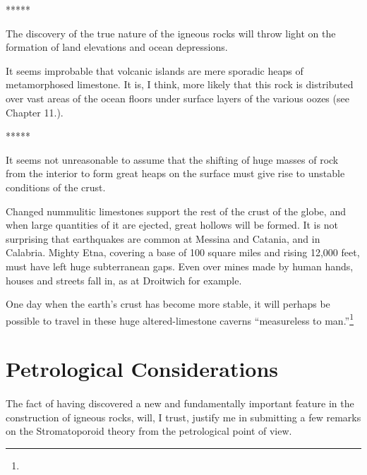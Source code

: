 \documentclass[a4paper, 12pt, oneside]{article}
\begin{document}
\centerline{*\hspace{15mm}*\hspace{15mm}*\hspace{15mm}*\hspace{15mm}*}
\bigskip

The discovery of the true nature of the igneous rocks will throw light on the formation of land elevations and ocean depressions.

It seems improbable that volcanic islands are mere sporadic heaps of metamorphosed limestone. It is, I think, more likely that this rock is distributed over vast areas of the ocean floors under surface layers of the various oozes (see Chapter 11.).

\centerline{*\hspace{15mm}*\hspace{15mm}*\hspace{15mm}*\hspace{15mm}*}
\bigskip

It seems not unreasonable to assume that the shifting of huge masses of rock from the interior to form great heaps on the surface must give rise to unstable conditions of the crust.

Changed nummulitic limestones support the rest of the crust of the globe, and when large quantities of it are ejected, great hollows will be formed. It is not surprising that earthquakes are common at Messina and Catania, and in Calabria. Mighty Etna, covering a base of 100 square miles and rising 12,000 feet, must have left huge subterranean gaps. Even over mines made by human hands, houses and streets fall in, as at Droitwich for example.

One day when the earth's crust has become more stable, it will perhaps be possible to travel in these huge altered-limestone caverns ``measureless to man.''\footnote{}
\clearpage
\section{Petrological Considerations}
\paragraph{}
The fact of having discovered a new and fundamentally important feature in the construction of igneous rocks, will, I trust, justify me in submitting a few remarks on the Stromatoporoid theory from the petrological point of view.
\end{document}
